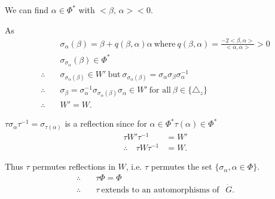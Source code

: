 We can find $\alpha \in \Phi^*$ with $<\beta,\, \alpha > < 0$.

As\pageoriginale 
\begin{align*}
  & \sigma_\alpha (\beta)  = \beta + q (\beta, \alpha) 
  \alpha ~\text{where}~ q (\beta, \alpha)= \frac{-2 <\beta,
    \alpha>}{<\alpha , \alpha>} > 0\\
  & \sigma_{\sigma_\alpha} (\beta)  \in \Phi^*  \\
  \therefore \quad & \sigma_{\sigma_\alpha(\beta)}  \in W'
  ~\text{but}~ \sigma_{\sigma_\alpha (\beta)} = \sigma_\alpha
  \sigma_\beta \sigma_\alpha^{-1}\\
  \therefore \quad & \sigma_\beta  = \sigma_\alpha^{-1}
  \sigma_{\sigma_\alpha (\beta)} \sigma_\alpha \in W' ~\text{for all}~
  \beta \in \{ \triangle_z\}\\
  \therefore \quad & W' = W.
\end{align*}

$\tau \sigma_\alpha \tau^{-1} = \sigma_{\tau(\alpha)}$ is a reflection
since for $\alpha \in \Phi^* \tau (\alpha) \in \Phi^*$
\begin{align*}
  \tau W' \tau^{-1} & = W'\\
  \therefore \quad \tau W \tau^{-1} & = W.
\end{align*}

Thus $\tau$ permutes reflections in $W$, i.e. $\tau$ permutes the set
$\{ \sigma_\alpha, \alpha \in \Phi \}$.
\begin{align*}
  \therefore & \quad \tau \Phi = \Phi\\
  \therefore & \quad \tau ~\text{extends to an automorphisms of }~~
  \dot{G}. 
\end{align*}
